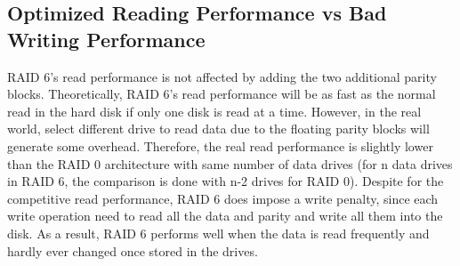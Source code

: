 \subsection{Optimized Reading Performance vs Bad Writing Performance}
RAID 6’s read performance is not affected by adding the two additional parity blocks. Theoretically, RAID 6’s read performance will be as fast as the normal read in the hard disk if only one disk is read at a time. However, in the real world, select different drive to read data due to the floating parity blocks will generate some overhead. Therefore, the real read performance is slightly lower than the RAID 0 architecture with same number of data drives (for n data drives in RAID 6, the comparison is done with n-2 drives for RAID 0).
Despite for the competitive read performance, RAID 6 does impose a write penalty, since each write operation need to read all the data and parity and write all them into the disk. As a result, RAID 6 performs well when the data is read frequently and hardly ever changed once stored in the drives.